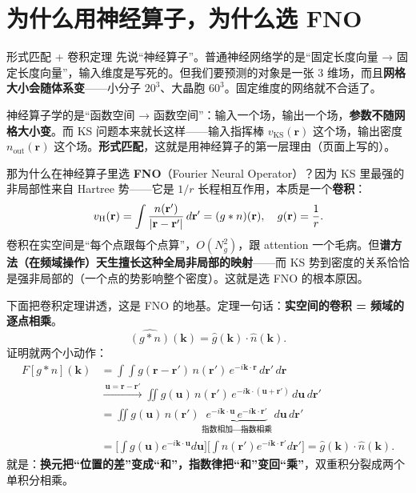 \documentclass[11pt, a4paper, fontset=none]{ctexart}
\newcommand{\hl}[1]{{\color{key}\bfseries #1}}
\begin{document}
\section{为什么用神经算子，为什么选 FNO}\label{sec:s5}

\begin{say}{形式匹配 + 卷积定理}
先说“神经算子”。普通神经网络学的是“固定长度向量 → 固定长度向量”，输入维度是写死的。但我们要预测的对象是一张 3 维场，而且\textbf{网格大小会随体系变}——小分子 $20^3$、大晶胞 $60^3$。固定维度的网络就不合适了。

神经算子学的是“函数空间 → 函数空间”：输入一个场，输出一个场，\hl{参数不随网格大小变}。而 KS 问题本来就长这样——输入指挥棒 $v_{\text{KS}}(\mathbf r)$ 这个场，输出密度 $n_{\text{out}}(\mathbf r)$ 这个场。\textbf{形式匹配}，这就是用神经算子的第一层理由（页面上写的）。

那为什么在神经算子里选 \hl{FNO}（Fourier Neural Operator）？因为 KS 里最强的非局部性来自 Hartree 势——它是 $1/r$ 长程相互作用，本质是一个\textbf{卷积}：
\begin{equation}
v_{\text H}(\mathbf r) = \int \frac{n(\mathbf r')}{|\mathbf r-\mathbf r'|}\,d\mathbf r' = (g*n)(\mathbf r),\quad g(\mathbf r)=\frac{1}{r}.
\end{equation}
卷积在实空间是“每个点跟每个点算”，$O(N_g^2)$，跟 attention 一个毛病。但\textbf{谱方法（在频域操作）天生擅长这种全局非局部的映射}——而 KS 势到密度的关系恰恰是强非局部的（一个点的势影响整个密度）。这就是选 FNO 的根本原因。

下面把卷积定理讲透，这是 FNO 的地基。定理一句话：\hl{实空间的卷积 = 频域的逐点相乘}。
\begin{equation}
\widehat{(g*n)}(\mathbf k) = \hat g(\mathbf k)\cdot \hat n(\mathbf k).
\end{equation}
证明就两个小动作：
\begin{equation}
\begin{aligned}
F[g*n](\mathbf k)
&= \int\!\int g(\mathbf r-\mathbf r')\,n(\mathbf r')\,e^{-i\mathbf k\cdot\mathbf r}\,d\mathbf r'\,d\mathbf r\\
&\xrightarrow{\ \mathbf u=\mathbf r-\mathbf r'\ } \iint g(\mathbf u)\,n(\mathbf r')\,e^{-i\mathbf k\cdot(\mathbf u+\mathbf r')}\,d\mathbf u\,d\mathbf r'\\
&= \iint g(\mathbf u)\,n(\mathbf r')\,\underbrace{e^{-i\mathbf k\cdot\mathbf u}\,e^{-i\mathbf k\cdot\mathbf r'}}_{\text{指数相加}\to\text{指数相乘}}\,d\mathbf u\,d\mathbf r'\\
&= \Big[\int g(\mathbf u)e^{-i\mathbf k\cdot\mathbf u}d\mathbf u\Big]\Big[\int n(\mathbf r')e^{-i\mathbf k\cdot\mathbf r'}d\mathbf r'\Big]
= \hat g(\mathbf k)\cdot\hat n(\mathbf k).
\end{aligned}
\end{equation}
就是：\hl{换元把“位置的差”变成“和”，指数律把“和”变回“乘”}，双重积分裂成两个单积分相乘。


\end{say}
\end{document}
